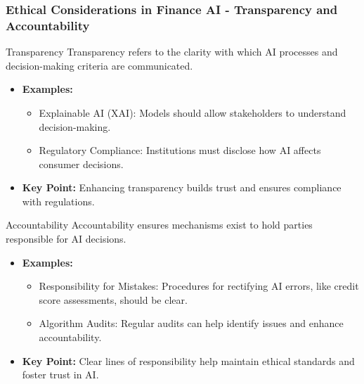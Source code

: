 \documentclass[aspectratio=169]{beamer}
\begin{document}
\begin{frame}[fragile]
    \frametitle{Ethical Considerations in Finance AI - Transparency and Accountability}
    \begin{block}{Transparency}
        Transparency refers to the clarity with which AI processes and decision-making criteria are communicated.
    \end{block}
    \begin{itemize}
        \item \textbf{Examples:}
        \begin{itemize}
            \item Explainable AI (XAI): Models should allow stakeholders to understand decision-making.
            \item Regulatory Compliance: Institutions must disclose how AI affects consumer decisions.
        \end{itemize}
        \item \textbf{Key Point:} Enhancing transparency builds trust and ensures compliance with regulations.
    \end{itemize}
    
    \begin{block}{Accountability}
        Accountability ensures mechanisms exist to hold parties responsible for AI decisions.
    \end{block}
    \begin{itemize}
        \item \textbf{Examples:}
        \begin{itemize}
            \item Responsibility for Mistakes: Procedures for rectifying AI errors, like credit score assessments, should be clear.
            \item Algorithm Audits: Regular audits can help identify issues and enhance accountability.
        \end{itemize}
        \item \textbf{Key Point:} Clear lines of responsibility help maintain ethical standards and foster trust in AI.
    \end{itemize}
\end{frame}
\end{document}
